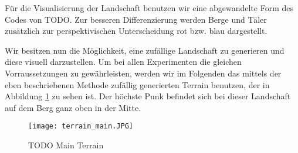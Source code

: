 Für die Visualisierung der Landschaft benutzen wir eine abgewandelte Form des Codes von TODO. Zur besseren Differenzierung werden Berge und Täler zusätzlich zur perspektivischen Unterscheidung rot bzw. blau dargestellt.

\smallspace

Wir besitzen nun die Möglichkeit, eine zufällige Landschaft zu generieren und diese visuell darzustellen. Um bei allen Experimenten die gleichen Vorraussetzungen zu gewährleisten, werden wir im Folgenden das mittels der eben beschriebenen Methode zufällig generierten Terrain benutzen, der in Abbildung \ref{img:terrainMain} zu sehen ist. Der höchste Punk befindet sich bei dieser Landschaft auf dem Berg ganz oben in der Mitte.

\begin{figure}[H]
    \centering
    \texttt{[image: terrain\_main.JPG]}
    \caption{TODO Main Terrain} \label{img:terrainMain}
\end{figure}